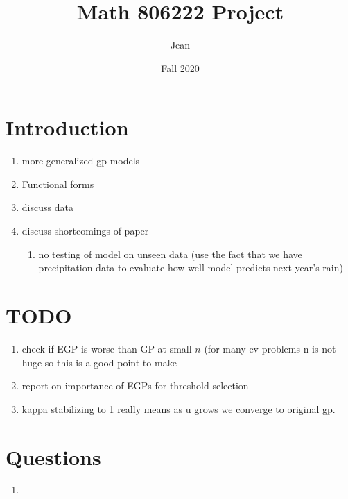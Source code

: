 \documentclass{article}
\title{Math 806222 Project}
\author{Jean }
\date{Fall 2020}
\theoremstyle{definition}
\theoremstyle{definition}
\begin{document}
\maketitle
\tableofcontents{}
\pagebreak
\section{Introduction}
\begin{enumerate}
    \item more generalized gp models
    \item Functional forms 
    \item discuss data 
    \item discuss shortcomings of paper
    \begin{enumerate}
        \item no testing of model on unseen data (use the fact that we have precipitation data to evaluate how well model predicts next year's rain)
    \end{enumerate}
\end{enumerate}

\section{TODO}
\begin{enumerate}
    \item check if EGP is worse than GP at small $n$ (for many ev problems n is not huge so this is a good point to make
    \item report on importance of EGPs for threshold selection
    \item kappa stabilizing to 1 really means as u grows we converge to original gp.
\end{enumerate}

\section{Questions }
\begin{enumerate}
    \item 
\end{enumerate}
\end{document}
